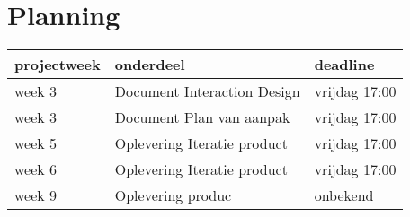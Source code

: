 \chapter{Planning} \label{cha:planning}



  \begin{tabular}{ | l | l | l |}
    \toprule
    {projectweek}     & {onderdeel} & {deadline}    \\
    \midrule
    week 3  & Document Interaction Design  	& vrijdag 17:00\\
    week 3	& Document Plan van aanpak     	& vrijdag 17:00\\
    week 5	& Oplevering Iteratie product	& vrijdag 17:00\\
    week 6	& Oplevering Iteratie product	& vrijdag 17:00\\
    week 9	& Oplevering produc				& onbekend\\
    \bottomrule
  \end{tabular}

